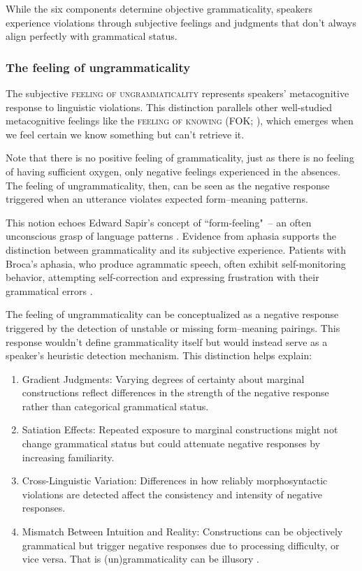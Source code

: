 \documentclass[12pt,letterpaper]{article}
\begin{document}
While the six components determine objective grammaticality, speakers experience violations through subjective feelings and judgments that don't always align perfectly with grammatical status.

\subsubsection{The feeling of ungrammaticality}\label{sec:feeling}

The subjective \textsc{feeling of ungrammaticality} represents speakers' metacognitive response to linguistic violations. This distinction parallels other well-studied metacognitive feelings like the \textsc{feeling of knowing} (FOK; \cite{hart1965}), which emerges when we feel certain we know something but can't retrieve it.

Note that there is no positive feeling of grammaticality, just as there is no feeling of having sufficient oxygen, only negative feelings experienced in the absences. The feeling of ungrammaticality, then, can be seen as the negative response triggered when an utterance violates expected form--meaning patterns.

This notion echoes Edward Sapir's concept of ``form-feeling"~-- an often unconscious grasp of language patterns \autocite{Sapir1921, Sapir1927b}. Evidence from aphasia supports the distinction between grammaticality and its subjective experience. Patients with Broca's aphasia, who produce agrammatic speech, often exhibit self-monitoring behavior, attempting self-correction and expressing frustration with their grammatical errors \autocite{oomen2005}.

The feeling of ungrammaticality can be conceptualized as a negative response triggered by the detection of unstable or missing form--meaning pairings. This response wouldn't define grammaticality itself but would instead serve as a speaker's heuristic detection mechanism. This distinction helps explain:

\begin{enumerate}
    \item Gradient Judgments: Varying degrees of certainty about marginal constructions reflect differences in the strength of the negative response rather than categorical grammatical status.

    \item Satiation Effects: Repeated exposure to marginal constructions might not change grammatical status but could attenuate negative responses by increasing familiarity.

    \item Cross-Linguistic Variation: Differences in how reliably morphosyntactic violations are detected affect the consistency and intensity of negative responses.

    \item Mismatch Between Intuition and Reality: Constructions can be objectively grammatical but trigger negative responses due to processing difficulty, or vice versa. That is (un)grammaticality can be illusory \parencite{Fanselow2021}.
\end{enumerate}
\end{document}
